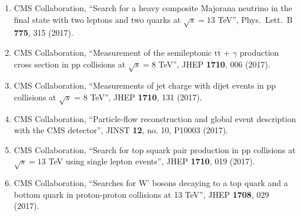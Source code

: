 \begin{itemize}
\begin{enumerate}
\item CMS Collaboration, ``Search for a heavy composite Majorana neutrino in the final state with two leptons and two quarks at $\sqrt{s}=13$ TeV'', Phys.\ Lett.\ B {\bf 775}, 315 (2017).

\item CMS Collaboration, ``Measurement of the semileptonic $ \mathrm{t}\overline{\mathrm{t}} $ + $\gamma$ production cross section in pp collisions at $ \sqrt{s}=8 $ TeV'', JHEP {\bf 1710}, 006 (2017).

\item CMS Collaboration, ``Measurements of jet charge with dijet events in pp collisions at $\sqrt{s}$ = 8 TeV'', JHEP {\bf 1710}, 131 (2017).

\item CMS Collaboration, ``Particle-flow reconstruction and global event description with the CMS detector'', JINST {\bf 12}, no. 10, P10003 (2017).

\item CMS Collaboration, ``Search for top squark pair production in pp collisions at $ \sqrt{s}=13 $ TeV using single lepton events'', JHEP {\bf 1710}, 019 (2017).

\item CMS Collaboration, ``Searches for W' bosons decaying to a top quark and a bottom quark in proton-proton collisions at 13 TeV'', JHEP {\bf 1708}, 029 (2017).


\end{enumerate}
\end{itemize}
